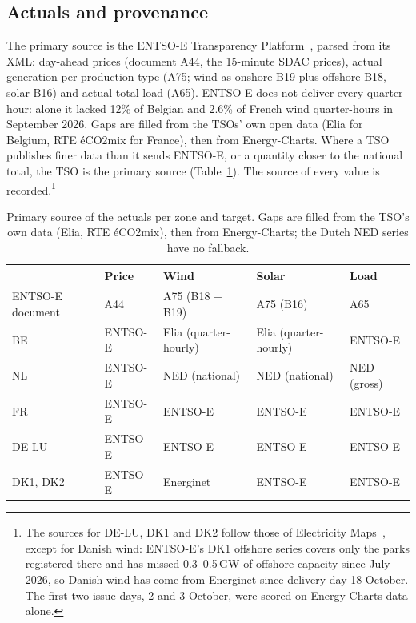 \documentclass[11pt,a4paper]{article}
\begin{document}
\subsection{Actuals and provenance}
\label{sec:actuals}

The primary source is the ENTSO-E Transparency Platform~\cite{entsoe}, parsed from its XML: day-ahead prices (document
A44, the 15-minute SDAC prices), actual generation per production type (A75; wind as onshore B19 plus offshore B18,
solar B16) and actual total load (A65). ENTSO-E does not deliver every quarter-hour: alone it lacked 12\% of Belgian
and 2.6\% of French wind quarter-hours in September 2026. Gaps are filled from the TSOs' own open data (Elia for
Belgium, RTE éCO2mix for France), then from Energy-Charts. Where a TSO publishes finer data than it sends ENTSO-E, or a
quantity closer to the national total, the TSO is the primary source (Table~\ref{tab:sources}). The source of every
value is recorded.\footnote{The sources for DE-LU, DK1 and DK2 follow those of Electricity Maps~\cite{electricitymaps},
except for Danish wind: ENTSO-E's DK1 offshore series covers only the parks registered there and has missed
0.3--0.5\,GW of offshore capacity since July 2026, so Danish wind has come from Energinet since delivery day 18
October. The first two issue days, 2 and 3 October, were scored on Energy-Charts data alone.}

\begin{table}[t]
\centering\small
\caption{Primary source of the actuals per zone and target. Gaps are filled from the TSO's own data (Elia, RTE
éCO2mix), then from Energy-Charts; the Dutch NED series have no fallback.}
\label{tab:sources}
\begin{tabular}{@{}lllll@{}}
\toprule
& Price & Wind & Solar & Load \\
\midrule
ENTSO-E document & A44 & A75 (B18 + B19) & A75 (B16) & A65 \\
\midrule
BE & ENTSO-E & Elia (quarter-hourly) & Elia (quarter-hourly) & ENTSO-E \\
NL & ENTSO-E & NED (national) & NED (national) & NED (gross) \\
FR & ENTSO-E & ENTSO-E & ENTSO-E & ENTSO-E \\
DE-LU & ENTSO-E & ENTSO-E & ENTSO-E & ENTSO-E \\
DK1, DK2 & ENTSO-E & Energinet & ENTSO-E & ENTSO-E \\
\bottomrule
\end{tabular}
\end{table}
\end{document}
